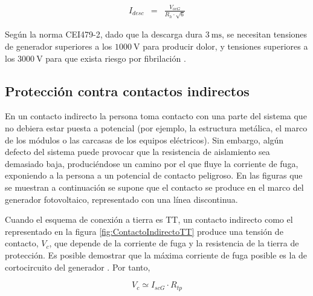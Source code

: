 \begin{eqnarray}
I_{desc} & = & \frac{V_{ocG}}{R_{h}\cdot\sqrt{6}}\label{eq:IdescIT}\end{eqnarray}

Según la norma CEI479-2, dado que la descarga dura $\SI{3}{\milli\second}$,
se necesitan tensiones de generador superiores a los $\SI{1000}{\volt}$
para producir dolor, y tensiones superiores a los $\SI{3000}{\volt}$
para que exista riesgo por fibrilación \cite{PerezGabarda2000a}.


\subsection{Protección contra contactos indirectos}

En un contacto indirecto la persona toma contacto con una parte del
sistema que no debiera estar puesta a potencial (por ejemplo, la estructura
metálica, el marco de los módulos o las carcasas de los equipos eléctricos).
Sin embargo, algún defecto del sistema puede provocar que la resistencia
de aislamiento sea demasiado baja, produciéndose un camino por el
que fluye la corriente de fuga, exponiendo a la persona a un potencial
de contacto peligroso. En las figuras que se muestran a continuación
se supone que el contacto se produce en el marco del generador fotovoltaico,
representado con una línea discontinua.

Cuando el esquema de conexión a tierra es TT, un contacto indirecto
como el representado en la figura \ref{fig:ContactoIndirectoTT} produce
una tensión de contacto, $V_{c}$,
que depende de la corriente de fuga y la resistencia de la tierra
de protección. Es posible demostrar que la máxima corriente de fuga
posible es la de cortocircuito del generador \cite{Gomez-Vidal2000}.
Por tanto, 

\begin{equation}
V_{c}\simeq I_{scG}\cdot R_{tp}\label{eq:VcIndirectoTT}\end{equation}


